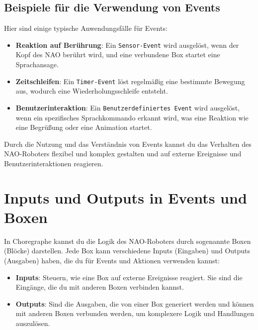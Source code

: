 \subsection{Beispiele für die Verwendung von Events}
Hier sind einige typische Anwendungsfälle für Events:
\begin{itemize}
    \item \textbf{Reaktion auf Berührung}: Ein \texttt{Sensor-Event} wird ausgelöst, wenn der Kopf des NAO berührt wird, und eine verbundene Box startet eine Sprachansage.
    \item \textbf{Zeitschleifen}: Ein \texttt{Timer-Event} löst regelmäßig eine bestimmte Bewegung aus, wodurch eine Wiederholungsschleife entsteht.
    \item \textbf{Benutzerinteraktion}: Ein \texttt{Benutzerdefiniertes Event} wird ausgelöst, wenn ein spezifisches Sprachkommando erkannt wird, was eine Reaktion wie eine Begrüßung oder eine Animation startet.
\end{itemize}

Durch die Nutzung und das Verständnis von Events kannst du das Verhalten des NAO-Roboters flexibel und komplex gestalten und auf externe Ereignisse und Benutzerinteraktionen reagieren.

\section{Inputs und Outputs in Events und Boxen}
In Choregraphe kannst du die Logik des NAO-Roboters durch sogenannte Boxen (Blöcke) darstellen. Jede Box kann verschiedene Inputs (Eingaben) und Outputs (Ausgaben) haben, die du für Events und Aktionen verwenden kannst:
\begin{itemize}
    \item \textbf{Inputs}: Steuern, wie eine Box auf externe Ereignisse reagiert. Sie sind die Eingänge, die du mit anderen Boxen verbinden kannst.
    \item \textbf{Outputs}: Sind die Ausgaben, die von einer Box generiert werden und können mit anderen Boxen verbunden werden, um komplexere Logik und Handlungen auszulösen.
\end{itemize}

